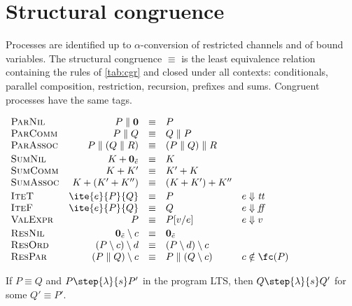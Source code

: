 \section{Structural congruence}

Processes are identified up to $\alpha$-conversion of restricted channels and of
bound variables. The structural congruence $\equiv$ is the least equivalence
relation containing the rules of \cref{tab:cgr} and closed under all
contexts: conditionals, parallel composition, restriction, recursion,
prefixes and sums. Congruent processes have the same tags.

\begin{table}[h]
\centering
\small
$\begin{array}{l@{\quad}rcl@{\quad}l}
\textsc{ParNil} & P \parallel \mathbf{0} &\equiv& P \\
\textsc{ParComm} & P \parallel Q &\equiv& Q \parallel P \\
\textsc{ParAssoc} & P \parallel (Q \parallel R) &\equiv& (P \parallel Q) \parallel R \\[2pt]
\textsc{SumNil} & K + \mathbf{0}_{\tilde e} &\equiv& K \\
\textsc{SumComm} & K + K' &\equiv& K' + K \\
\textsc{SumAssoc} & K + (K' + K'') &\equiv& (K + K') + K'' \\[2pt]
\textsc{IteT} & \ite{e}{P}{Q} &\equiv& P & e \Downarrow \mathit{tt} \\
\textsc{IteF} & \ite{e}{P}{Q} &\equiv& Q & e \Downarrow \mathit{ff} \\
\textsc{ValExpr} & P &\equiv& P[v/e] & e \Downarrow v \\[2pt]
\textsc{ResNil} & \mathbf{0}_{\tilde e} \setminus c &\equiv& \mathbf{0}_{\tilde e} \\
\textsc{ResOrd} & (P \setminus c) \setminus d &\equiv& (P \setminus d) \setminus c \\
\textsc{ResPar} & (P \parallel Q) \setminus c &\equiv& P \parallel (Q \setminus c) & c \notin \fc(P)
\end{array}$
\caption{Structural congruence. In \textsc{ValExpr}, $e$ is an expression of
an output, of a conditional, of a deadlock $\mathbf{0}_{\tilde e}$ or of a
quantum prefix, and $P[v/e]$ replaces it by its value. $\fc(P)$ is the set of
free channels of $P$.}
\label{tab:cgr}
\end{table}

\begin{lemma}\label{lem:cgr-bisim}
If $P \equiv Q$ and $P \step{\lambda}{s} P'$ in the program LTS, then
$Q \step{\lambda}{s} Q'$ for some $Q' \equiv P'$.
\end{lemma}

